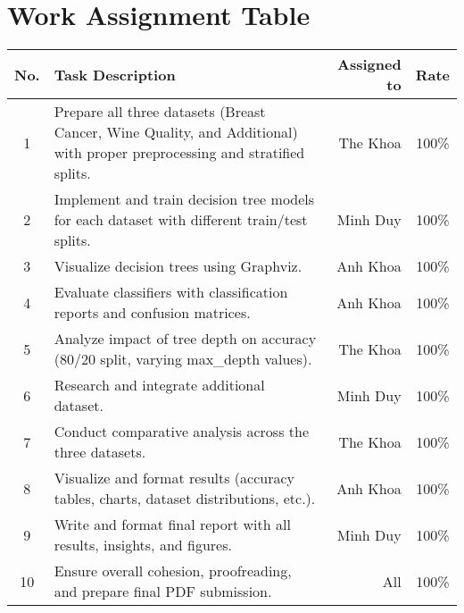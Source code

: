 \section{Work Assignment Table}
\begin{center}
  \renewcommand{\arraystretch}{1.5}
  \begin{tabular}{|c|p{}|r|c|}
    \hline
    \textbf{No.} & \textbf{Task Description}                                                                                                 & \textbf{Assigned to} & \textbf{Rate} \\\hline
    1            & Prepare all three datasets (Breast Cancer, Wine Quality, and Additional) with proper preprocessing and stratified splits. & The Khoa             & 100\%         \\\hline
    2            & Implement and train decision tree models for each dataset with different train/test splits.                               & Minh Duy             & 100\%         \\\hline
    3            & Visualize decision trees using Graphviz.                                                                                  & Anh Khoa             & 100\%         \\\hline
    4            & Evaluate classifiers with classification reports and confusion matrices.                                                  & Anh Khoa             & 100\%         \\\hline
    5            & Analyze impact of tree depth on accuracy (80/20 split, varying max\_depth values).                                        & The Khoa             & 100\%         \\\hline
    6            & Research and integrate additional dataset.                                                                                & Minh Duy             & 100\%         \\\hline
    7            & Conduct comparative analysis across the three datasets.                                                                   & The Khoa             & 100\%         \\\hline
    8            & Visualize and format results (accuracy tables, charts, dataset distributions, etc.).                                      & Anh Khoa             & 100\%         \\\hline
    9            & Write and format final report with all results, insights, and figures.                                                    & Minh Duy             & 100\%         \\\hline
    10           & Ensure overall cohesion, proofreading, and prepare final PDF submission.                                                  & All                  & 100\%         \\\hline
  \end{tabular}
\end{center}
